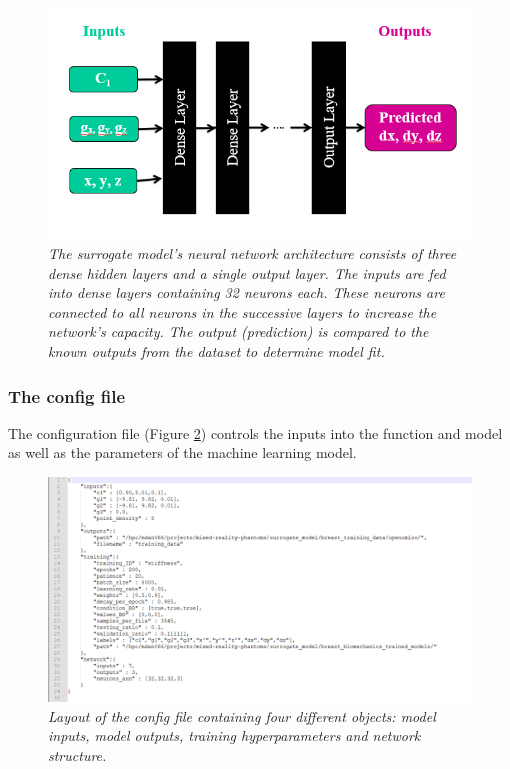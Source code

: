 \documentclass[11pt]{article}
\begin{document}
\begin{figure}[H]
    \centering
    \includegraphics[scale=0.75]{Images/breast/machine_learning/surrogate_network.png}
    \caption{\textit{\label{fig1}The surrogate model's neural network architecture consists of three dense hidden layers and a single output layer. The inputs are fed into dense layers containing 32 neurons each. These neurons are connected to all neurons in the successive layers to increase the network's capacity. The output (prediction) is compared to the known outputs from the dataset to determine model fit.}}
\end{figure}

\subsubsection{The config file}
The configuration file (Figure \ref{fig2}) controls the inputs into the function and model as well as the parameters of the machine learning model.

\begin{figure}[H]
    \centering
    \includegraphics[scale=1.1]{Images/breast/machine_learning/breast_opencmiss_config.png}
    \caption{\textit{\label{fig2}Layout of the config file containing four different objects: model inputs, model outputs, training hyperparameters and network structure.}}
\end{figure}
\end{document}
